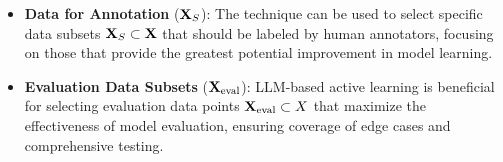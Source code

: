 \begin{itemize}[left=0pt]
    \item \textbf{Data for Annotation} ($\boldsymbol{\mathrm{X}}_{S}$): 
    The technique can be used to select specific data subsets $\boldsymbol{\mathrm{X}}_{S} \subset \boldsymbol{\mathrm{X}}$ that should be labeled by human annotators, focusing on those that provide the greatest potential improvement in model learning.
    
    \item \textbf{Evaluation Data Subsets} ($\boldsymbol{\mathrm{X}}_{\text{eval}}$): 
    LLM-based active learning is beneficial for selecting evaluation data points $\boldsymbol{\mathrm{X}}_{\text{eval}} \subset X$ that maximize the effectiveness of model evaluation, ensuring coverage of edge cases and comprehensive testing.
\end{itemize}
\begin{comment}
\section{Detailed LLM-based AL Formulation} \label{llm-based-AL-formulation}


\todo{complete this part, add equations for various parts, and discuss trade-offs at high-level, can also reference the two taxonomy tables, etc...}

\todo{significantly improve this, or comment it out if we run out of time. We will need something formal for this. Would also be great to have this also in Section 2, even if it is much more condensed.}


Let $\mathcal{M}$ be an LLM parameterized by $\theta$ that takes a text sequence $X = (x_1, \cdots, x_m) \in \X$ as input 
and produces an output $\yhat \in \hat{\Y}$, where $\yhat = \mathcal{M}(X; \theta)$; the form of $\yhat$ is task-dependent. The inputs may be drawn from a labeled dataset $\D = \{ (X^{(1)}, Y^{(1)}), \cdots, (X^{(N)}, Y^{(N)})\}$, or an unlabeled dataset of prompts for sentence continuations and completions $\D = \{ X^{(1)}, \cdots, X^{(N)} \}$.




\end{comment}
